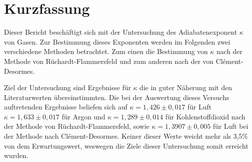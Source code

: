 \section{Kurzfassung}

	Dieser Bericht beschäftigt sich mit der Untersuchung des Adiabatenexponent $\kappa$ von Gasen.
	Zur Bestimmung dieses Exponenten werden im Folgenden zwei verschiedene Methoden betrachtet.
	Zum einen die Bestimmung von $\kappa$ nach der Methode von Rüchardt-Flammersfeld und zum anderen nach der von Clément-Desormes.
	
	Ziel der Untersuchung sind Ergebnisse für $\kappa$ die in guter Näherung mit den Literaturwerten übereinstimmten. 
	Die bei der Auswertung dieses Versuchs auftretenden Ergebnisse beliefen sich auf $\kappa = 1,426\pm 0,017$ für Luft $\kappa = 1,633\pm 0,017$ für Argon und $\kappa = 1,289\pm 0,014$ für Kohlenstoffdioxid nach der Methode von Rüchardt-Flammersfeld, sowie $\kappa = 1,3907\pm 0,005$ für Luft bei der Methode nach Clément-Desormes.
	Keiner dieser Werte weicht mehr als 3,5\% von dem Erwartungswert, weswegen die Ziele dieser Untersuchung somit erreicht wurden.